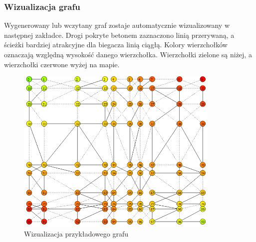 \documentclass[12pt,a4paper]{article}
\begin{document}
\subsubsection{Wizualizacja grafu}
Wygenerowany lub wczytany graf zostaje automatycznie wizualizowany w następnej zakładce. Drogi pokryte betonem zaznaczono linią przerywaną, a ścieżki bardziej atrakcyjne dla biegacza linią ciągłą.
Kolory wierzchołków oznaczają względną wysokość danego wierzchołka. Wierzchołki zielone są niżej, a wierzchołki czerwone wyżej na mapie.
\begin{figure}[!h]
	\centering
	\includegraphics[height=80mm]{./ilustracje/screen2.png}
	\caption{Wizualizacja przykładowego grafu}
\end{figure}
\end{document}

